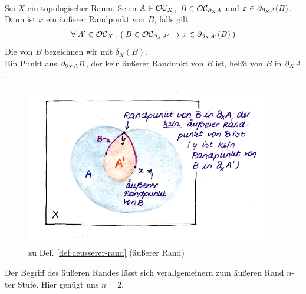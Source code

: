     \begin{dfn}\label{def:aeusserer-rand} \ \vspace{8pt}

        \noindent
        Sei $X$ ein topologischer Raum.
        Seien $A \in \mathcal{OC}_X$, $B \in \mathcal{OC}_{\partial_X A}$ und $x \in \partial_{\partial_X A}(B)$. Dann ist $x$ ein äußerer Randpunkt von $B$, falls gilt
        \begin{align*}
            \forall\: A' \in \mathcal{OC}_X : (\: B \in \mathcal{OC}_{\partial_X A'} \rightarrow x \in \partial_{\partial_X A'}(B) \:)
        \end{align*}
        Die  von $B$ bezeichnen wir mit $\delta_X(B)$.\\
        Ein Punkt aus $\partial_{\partial_X A} B$, der kein äußerer Randunkt von $B$ ist, heißt  von $B$ in $\partial_X A$.
    \end{dfn}


    \begin{figure}[ht]
        \centering
        \includegraphics[height=7cm]{luise/aeusserer-rand.png}
        \caption{zu Def. \ref{def:aeusserer-rand} (äußerer Rand)}
        \label{fig:aeus-rand}
    \end{figure}
    
% 
% 
    
    Der
    Begriff des äußeren Randes lässt sich verallgemeinern zum äußeren Rand $n$-ter Stufe. Hier genügt uns $n = 2$.
    

